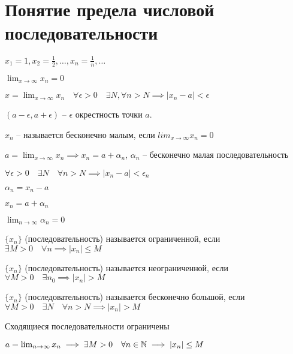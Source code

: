 \section{Понятие предела числовой последовательности}

$x_1 = 1, x_2 = \frac{1}{2}, \dots, x_n = \frac{1}{n}, \dots$

$\lim_{x \to \infty} x_n = 0$

\begin{definition}
    $x = \lim_{x\to\infty} x_n \quad \forall \epsilon > 0 \quad \exists N, \forall n > N \implies |x_n - a| < \epsilon$

    $(a - \epsilon, a + \epsilon)$ -- $\epsilon$ окрестность точки $a$.
\end{definition}

\begin{definition}
    $x_n$ -- называется бесконечно малым, если
    $lim_{x\to\infty} x_n = 0$
\end{definition}

\begin{theorem}
    $a = \lim_{x\to\infty} x_n \implies x_n = a + \alpha_n$, $\alpha_n$ -- бесконечно малая последовательность

    $\forall \epsilon > 0 \quad \exists N \quad \forall n > N \implies |x_n - a| < \epsilon_n$

    $\alpha_n = x_n - a$

    $x_n = a + \alpha_n$

    $\lim_{n\to\infty} \alpha_n = 0$
\end{theorem}

\begin{definition}
    $\{x_n\}$ (последовательность) называется ограниченной, если $\exists M > 0 \quad \forall n \implies |x_n| \leq M$
\end{definition}

\begin{definition}
    $\{x_n\}$ (последовательность) называется неограниченной, если $\forall M > 0 \quad \exists n_0 \implies |x_n| > M$
\end{definition}

\begin{definition}
    $\{x_n\}$ (последовательность) называется бесконечно большой, если $\forall M > 0 \quad \exists N \quad \forall n > N \implies |x_n| > M$
\end{definition}


\begin{statement}
    Сходящиеся последовательности ограничены
\end{statement}

\begin{statement}
    $a = \lim_{n\to\infty} x_n \implies \exists M > 0 \quad \forall n \in \mathbb{N} \implies |x_n| \leq M$
\end{statement}
